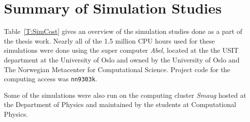 \section{Summary of Simulation Studies}
\label{SimA:Summary}

Table~\ref{T:SimCost} gives an overview of the simulation studies done as a part of the thesis work.
Nearly all of the 1.5 million CPU hours used for these simulations were done using the super computer \textit{Abel}, located at the the USIT department at the University of Oslo and owned by the University of Oslo and The Norwegian Metacenter for Computational Science.
Project code for the computing access was \texttt{nn9303k}.

Some of the simulations were also run on the computing cluster \textit{Smaug} hosted at the Department of Physics and maintained by the students at Computational Physics.

